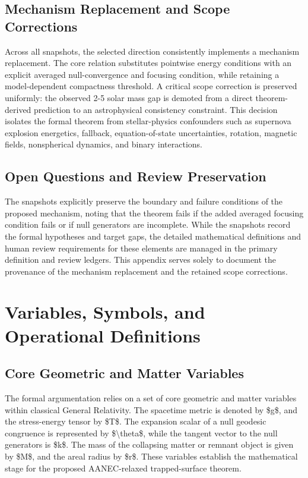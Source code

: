 \documentclass[conference]{IEEEtran}
\begin{document}
\subsection{Mechanism Replacement and Scope Corrections}
Across all snapshots, the selected direction consistently implements a mechanism replacement. The core relation substitutes pointwise energy conditions with an explicit averaged null-convergence and focusing condition, while retaining a model-dependent compactness threshold. A critical scope correction is preserved uniformly: the observed 2-5 solar mass gap is demoted from a direct theorem-derived prediction to an astrophysical consistency constraint. This decision isolates the formal theorem from stellar-physics confounders such as supernova explosion energetics, fallback, equation-of-state uncertainties, rotation, magnetic fields, nonspherical dynamics, and binary interactions.

\subsection{Open Questions and Review Preservation}
The snapshots explicitly preserve the boundary and failure conditions of the proposed mechanism, noting that the theorem fails if the added averaged focusing condition fails or if null generators are incomplete. While the snapshots record the formal hypotheses and target gaps, the detailed mathematical definitions and human review requirements for these elements are managed in the primary definition and review ledgers. This appendix serves solely to document the provenance of the mechanism replacement and the retained scope corrections.

\section{Variables, Symbols, and Operational Definitions}
\subsection{Core Geometric and Matter Variables}
The formal argumentation relies on a set of core geometric and matter variables within classical General Relativity. The spacetime metric is denoted by \$g\$, and the stress-energy tensor by \$T\$. The expansion scalar of a null geodesic congruence is represented by \$\textbackslash{}theta\$, while the tangent vector to the null generators is \$k\$. The mass of the collapsing matter or remnant object is given by \$M\$, and the areal radius by \$r\$. These variables establish the mathematical stage for the proposed AANEC-relaxed trapped-surface theorem.
\end{document}
